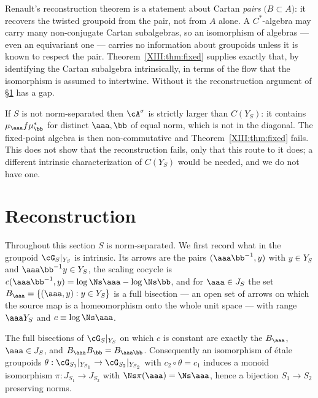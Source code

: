 \begin{remark}\label{XIII:rem:whyneeded}
Renault's reconstruction theorem is a statement about Cartan \emph{pairs}
$\bigl(B\subset A\bigr)$: it recovers the twisted groupoid from the pair, not from $A$ alone.
A $C^*$-algebra may carry many non-conjugate Cartan subalgebras, so an isomorphism of algebras
--- even an equivariant one --- carries no information about groupoids unless it is known to
respect the pair. Theorem~\ref{XIII:thm:fixed} supplies exactly that, by identifying the Cartan
subalgebra intrinsically, in terms of the flow that the isomorphism is assumed to intertwine.
Without it the reconstruction argument of \S\ref{XIII:sec:rec} has a gap.
\end{remark}

\begin{remark}\label{XIII:rem:unsep}
If $S$ is not norm-separated then $\cA^\sigma$ is strictly larger than $C(Y_S)$: it contains
$\mu_\aaa f\mu_{\bb}^*$ for distinct $\aaa,\bb$ of equal norm, which is not in the diagonal.
The fixed-point algebra is then non-commutative and Theorem~\ref{XIII:thm:fixed} fails. This does not
show that the reconstruction fails, only that this route to it does; a different intrinsic
characterization of $C(Y_S)$ would be needed, and we do not have one.
\end{remark}

\section{Reconstruction}\label{XIII:sec:rec}

Throughout this section $S$ is norm-separated. We first record what in the groupoid
$\cG_S|_{Y_S}$ is intrinsic. Its arrows are the pairs $(\aaa\bb^{-1},y)$ with $y\in Y_S$ and
$\aaa\bb^{-1}y\in Y_S$, the scaling cocycle is $c(\aaa\bb^{-1},y)=\log\Ns\aaa-\log\Ns\bb$,
and for $\aaa\in J_S$ the set $B_\aaa=\{(\aaa,y):y\in Y_S\}$ is a full bisection --- an
open set of arrows on which the source map is a homeomorphism onto the whole unit space
--- with range $\aaa Y_S$ and $c\equiv\log\Ns\aaa$.

\begin{lemma}\label{XIII:lem:bisections}
The full bisections of $\cG_S|_{Y_S}$ on which $c$ is constant are exactly the $B_\aaa$,
$\aaa\in J_S$, and $B_\aaa B_\bb=B_{\aaa\bb}$. Consequently an isomorphism of \'etale
groupoids $\theta:\cG_{S_1}|_{Y_{S_1}}\to\cG_{S_2}|_{Y_{S_2}}$ with $c_2\circ\theta=c_1$ induces a
monoid isomorphism $\pi:J_{S_1}\to J_{S_2}$ with $\Ns\pi(\aaa)=\Ns\aaa$, hence a bijection
$S_1\to S_2$ preserving norms.
\end{lemma}

